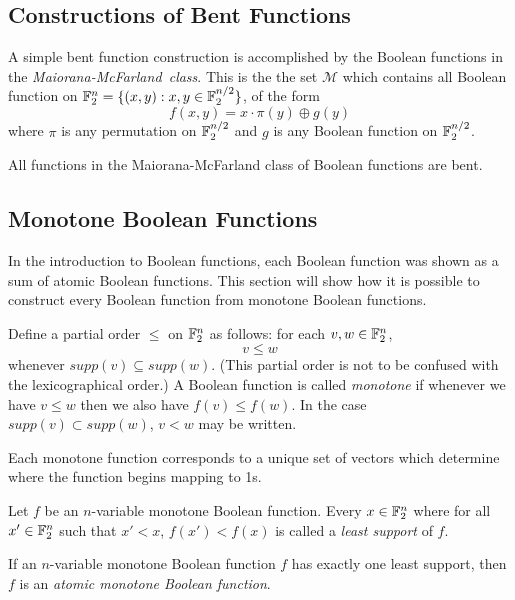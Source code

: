 
\subsection{Constructions of Bent Functions}
\par A simple bent function construction is accomplished by the Boolean
functions in the {\em Maiorana-McFarland\ class}. This is the the set
$\mathcal{M}$ which contains all Boolean function on
$\mathbb{F}_2^n=\{(x,y):x,y\in\mathbb{F}_2^{n/2}\}$, of the form
  \[
  f(x,y)=x\cdot\pi(y)\oplus g(y)
  \]
where $\pi$ is any permutation on $\mathbb{F}_2^{n/2}$ and $g$ is any Boolean
function on $\mathbb{F}_2^{n/2}$.

\par All functions in the Maiorana-McFarland class of Boolean functions are
bent.


\subsection{Monotone Boolean Functions}
\par In the introduction to Boolean functions, each Boolean function was
shown as a sum of atomic Boolean functions. This section will show how it is
possible to construct every Boolean function from monotone Boolean
functions.

\par Define a partial order $\leq $ on $\mathbb{F}_2^n$ as follows:
for each $v,w\in \mathbb{F}_2^n$,
\[
v\leq w
\]
whenever $supp(v)\subseteq supp(w)$.
(This partial order is not to be confused with the lexicographical order.)
A Boolean function is called {\it monotone} if whenever we have $v\leq w$
then we also have $f(v) \leq f(w)$. In the case $supp(v)\subset supp(w)$,
$v<w$ may be written.

\par Each monotone function corresponds to a unique set of vectors which
determine where the function begins mapping to 1s.

\begin{definition}
  Let $f$ be an $n$-variable monotone Boolean function. Every $x\in\mathbb{F}_2^n$
  where for all $x'\in\mathbb{F}_2^n$ such that $x'<x$, $f(x')<f(x)$ is called a
  \textit{least support} of $f$.
\end{definition}

\begin{definition}
  If an $n$-variable monotone Boolean function $f$ has exactly one least
  support, then $f$ is an \textit{atomic monotone Boolean function}.
\end{definition}

